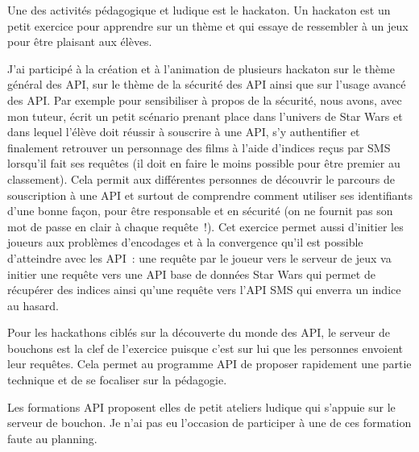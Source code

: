         Une des activités pédagogique et ludique est le hackaton.
        Un hackaton est un petit exercice pour apprendre sur un thème et qui essaye de ressembler à un jeux pour être plaisant aux élèves.

        J’ai participé à la création et à l’animation de plusieurs hackaton sur le thème général des API, sur le thème de la sécurité des API ainsi que sur l’usage avancé des API.
        Par exemple pour sensibiliser à propos de la sécurité, nous avons, avec mon tuteur, écrit un petit scénario prenant place dans l’univers de Star Wars et dans lequel l’élève doit réussir à souscrire à une API, s’y authentifier et finalement retrouver un personnage des films à l’aide d’indices reçus par SMS lorsqu’il fait ses requêtes (il doit en faire le moins possible pour être premier au classement).
        Cela permit aux différentes personnes de découvrir le parcours de souscription à une API et surtout de comprendre comment utiliser ses identifiants d’une bonne façon, pour être responsable et en sécurité (on ne fournit pas son mot de passe en clair à chaque requête !).
        Cet exercice permet aussi d’initier les joueurs aux problèmes d’encodages et à la convergence qu’il est possible d’atteindre avec les API : une requête par le joueur vers le serveur de jeux va initier une requête vers une API base de données Star Wars qui permet de récupérer des indices ainsi qu’une requête vers l’API SMS qui enverra un indice au hasard.

        Pour les hackathons ciblés sur la découverte du monde des API, le serveur de bouchons est la clef de l’exercice puisque c’est sur lui que les personnes envoient leur requêtes.
        Cela permet au programme API de proposer rapidement une partie technique et de se focaliser sur la pédagogie.

        Les formations API proposent elles de petit ateliers ludique qui s'appuie sur le serveur de bouchon.
        Je n’ai pas eu l’occasion de participer à une de ces formation faute au planning.
